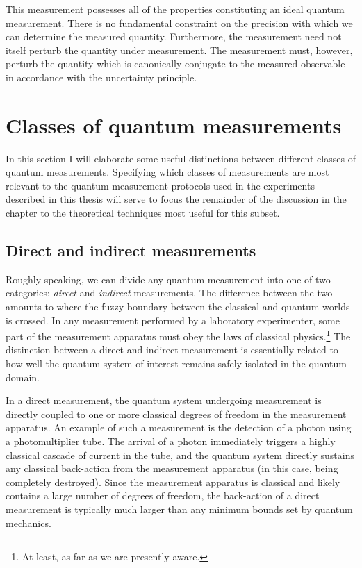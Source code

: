 This measurement possesses all of the properties constituting an ideal quantum measurement.  There is no fundamental constraint on the precision with which we can determine the measured quantity.  Furthermore, the measurement need not itself perturb the quantity under measurement.  The measurement must, however, perturb the quantity which is canonically conjugate to the measured observable in accordance with the uncertainty principle.

\section{Classes of quantum measurements}

In this section I will elaborate some useful distinctions between different classes of quantum measurements.  Specifying which classes of measurements are most relevant to the quantum measurement protocols used in the experiments described in this thesis will serve to focus the remainder of the discussion in the chapter to the theoretical techniques most useful for this subset.

\subsection{Direct and indirect measurements}

Roughly speaking, we can divide any quantum measurement into one of two categories: \textit{direct} and \textit{indirect} measurements.  The difference between the two amounts to where the fuzzy boundary between the classical and quantum worlds is crossed.  In any measurement performed by a laboratory experimenter, some part of the measurement apparatus must obey the laws of classical physics.\footnote{At least, as far as we are presently aware.} The distinction between a direct and indirect measurement is essentially related to how well the quantum system of interest remains safely isolated in the quantum domain.

In a direct measurement, the quantum system undergoing measurement is directly coupled to one or more classical degrees of freedom in the measurement apparatus.  An example of such a measurement is the detection of a photon using a photomultiplier tube.  The arrival of a photon immediately triggers a highly classical cascade of current in the tube, and the quantum system directly sustains any classical back-action from the measurement apparatus (in this case, being completely destroyed).  Since the measurement apparatus is classical and likely contains a large number of degrees of freedom, the back-action of a direct measurement is typically much larger than any minimum bounds set by quantum mechanics.

